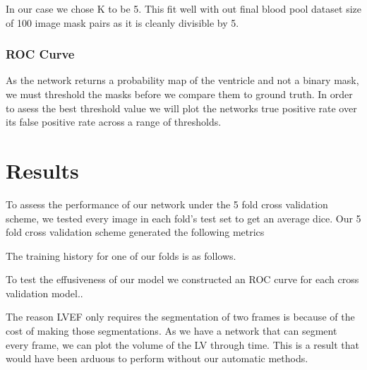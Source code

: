 \documentclass[12pt]{article}
\begin{document}
In our case we chose K to be 5.
This fit well with out final blood pool dataset size of 100 image mask pairs as it is cleanly divisible by 5.


\subsubsection{ROC Curve}
As the network returns a probability map of the ventricle and not a binary mask, we must threshold the masks before we compare them to ground truth.
In order to asess the best threshold value we will plot the networks true positive rate over its false positive rate across a range of thresholds.

\section{Results}
To assess the performance of our network under the 5 fold cross validation scheme, we tested every image in each fold's test set to get an average dice.
Our 5 fold cross validation scheme generated the following metrics


The training history for one of our folds is as follows.

To test the effusiveness of our model we constructed an ROC curve for each cross validation model..


The reason LVEF only requires the segmentation of two frames is because of the cost of making those segmentations.
As we have a network that can segment every frame, we can plot the volume of the LV through time.
This is a result that would have been arduous to perform without our automatic methods.

\end{document}
